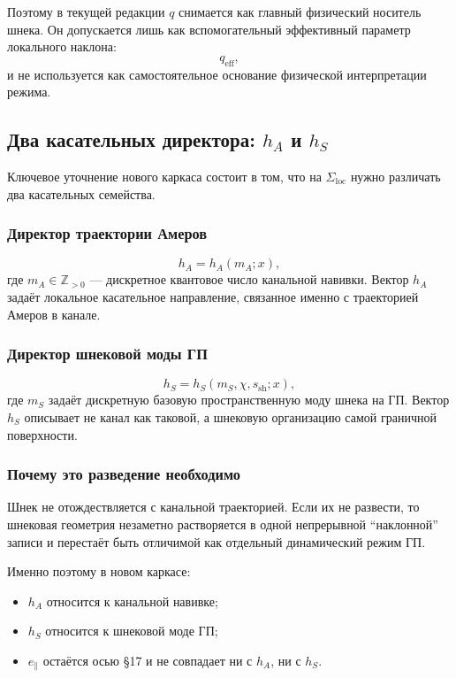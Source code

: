 Поэтому в текущей редакции \(q\) снимается как главный физический носитель шнека. Он допускается лишь как вспомогательный эффективный параметр локального наклона:
\[
q_{\mathrm{eff}},
\]
и не используется как самостоятельное основание физической интерпретации режима.

\subsection{Два касательных директора: \(h_A\) и \(h_S\)}

Ключевое уточнение нового каркаса состоит в том, что на \(\Sigma_{\mathrm{loc}}\) нужно различать два касательных семейства.

\subsubsection{Директор траектории Амеров}

\[
h_A=h_A(m_A;x),
\]
где \(m_A\in\mathbb{Z}_{>0}\) --- дискретное квантовое число канальной навивки. Вектор \(h_A\) задаёт локальное касательное направление, связанное именно с траекторией Амеров в канале.

\subsubsection{Директор шнековой моды ГП}

\[
h_S=h_S(m_S,\chi,s_{\mathrm{sh}};x),
\]
где \(m_S\) задаёт дискретную базовую пространственную моду шнека на ГП. Вектор \(h_S\) описывает не канал как таковой, а шнековую организацию самой граничной поверхности.

\subsubsection{Почему это разведение необходимо}

Шнек не отождествляется с канальной траекторией. Если их не развести, то шнековая геометрия незаметно растворяется в одной непрерывной ``наклонной'' записи и перестаёт быть отличимой как отдельный динамический режим ГП.

Именно поэтому в новом каркасе:
\begin{itemize}
\item \(h_A\) относится к канальной навивке;
\item \(h_S\) относится к шнековой моде ГП;
\item \(e_\parallel\) остаётся осью §17 и не совпадает ни с \(h_A\), ни с \(h_S\).
\end{itemize}

